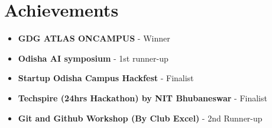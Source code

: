 \documentclass[a4paper,12pt]{article}
\begin{document}
\section{Achievements}
\begin{itemize}[nosep,after=\strut, leftmargin=1em, itemsep=3pt,label=--]
\item \textbf{GDG ATLAS ONCAMPUS} - Winner
\item \textbf{Odisha AI symposium} - 1st runner-up
\item \textbf{Startup Odisha Campus Hackfest} - Finalist
\item \textbf{Techspire (24hrs Hackathon) by NIT Bhubaneswar} - Finalist
\item \textbf{Git and Github Workshop (By Club Excel)} - 2nd Runner-up
\end{itemize}

\vfill
\end{document}
